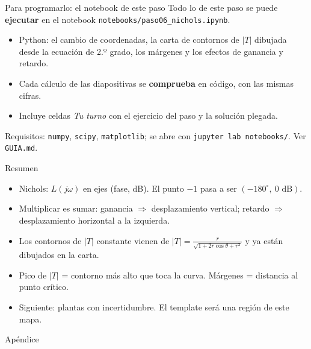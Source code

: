 \documentclass[aspectratio=169,11pt]{beamer}
\begin{document}
\begin{frame}{Para programarlo: el notebook de este paso}
  \small
  Todo lo de este paso se puede \textbf{ejecutar} en el notebook \texttt{notebooks/paso06\_nichols.ipynb}.
  \begin{itemize}
    \item Python: el cambio de coordenadas, la carta de contornos de $|T|$ dibujada desde la ecuación de 2.º grado, los márgenes y los efectos de ganancia y retardo.
    \item Cada cálculo de las diapositivas se \textbf{comprueba} en código, con las mismas cifras.
    \item Incluye celdas \emph{Tu turno} con el ejercicio del paso y la solución plegada.
  \end{itemize}
  \footnotesize Requisitos: \texttt{numpy}, \texttt{scipy}, \texttt{matplotlib}; se abre con \texttt{jupyter lab notebooks/}. Ver \texttt{GUIA.md}.
\end{frame}

\begin{frame}{Resumen}
  \small
  \begin{itemize}
    \item Nichols: $L(j\omega)$ en ejes (fase, dB). El punto $-1$ pasa a ser $(-180^\circ,\ 0\text{ dB})$.
    \item Multiplicar es sumar: ganancia $\Rightarrow$ desplazamiento vertical; retardo $\Rightarrow$ desplazamiento horizontal a la izquierda.
    \item Los contornos de $|T|$ constante vienen de $|T|=\frac{r}{\sqrt{1+2r\cos\theta+r^2}}$ y ya están dibujados en la carta.
    \item Pico de $|T|$ = contorno más alto que toca la curva. Márgenes = distancia al punto crítico.
    \item Siguiente: plantas con incertidumbre. El template será una región de este mapa.
  \end{itemize}
\end{frame}

\appendix
\begin{frame}\centering\Large Apéndice\end{frame}
\end{document}
